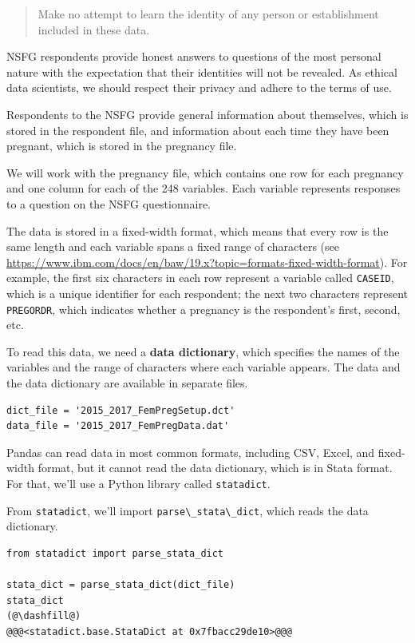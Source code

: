 \begin{quote}
Make no attempt to learn the identity of any person or establishment
included in these data.
\end{quote}

NSFG respondents provide honest answers to questions of the most
personal nature with the expectation that their identities will not be
revealed. As ethical data scientists, we should respect their privacy
and adhere to the terms of use.

Respondents to the NSFG provide general information about themselves,
which is stored in the respondent file, and information about each time
they have been pregnant, which is stored in the pregnancy file.

We will work with the pregnancy file, which contains one row for each
pregnancy and one column for each of the 248 variables. Each variable
represents responses to a question on the NSFG questionnaire.

The data is stored in a fixed-width format, which means that every row
is the same length and each variable spans a fixed range of characters
(see
\url{https://www.ibm.com/docs/en/baw/19.x?topic=formats-fixed-width-format}).
For example, the first six characters in each row represent a variable
called \passthrough{\lstinline!CASEID!}, which is a unique identifier
for each respondent; the next two characters represent
\passthrough{\lstinline!PREGORDR!}, which indicates whether a pregnancy
is the respondent's first, second, etc.

To read this data, we need a \textbf{data dictionary}, which specifies
the names of the variables and the range of characters where each
variable appears. The data and the data dictionary are available in
separate files.

\begin{lstlisting}[]
dict_file = '2015_2017_FemPregSetup.dct'
data_file = '2015_2017_FemPregData.dat'
\end{lstlisting}

Pandas can read data in most common formats, including CSV, Excel, and
fixed-width format, but it cannot read the data dictionary, which is in
Stata format. For that, we'll use a Python library called
\passthrough{\lstinline!statadict!}.

From \passthrough{\lstinline!statadict!}, we'll import
\passthrough{\lstinline!parse\_stata\_dict!}, which reads the data
dictionary.

\begin{lstlisting}[]
from statadict import parse_stata_dict

stata_dict = parse_stata_dict(dict_file)
stata_dict
(@\dashfill@)
@@@<statadict.base.StataDict at 0x7fbacc29de10>@@@
\end{lstlisting}

